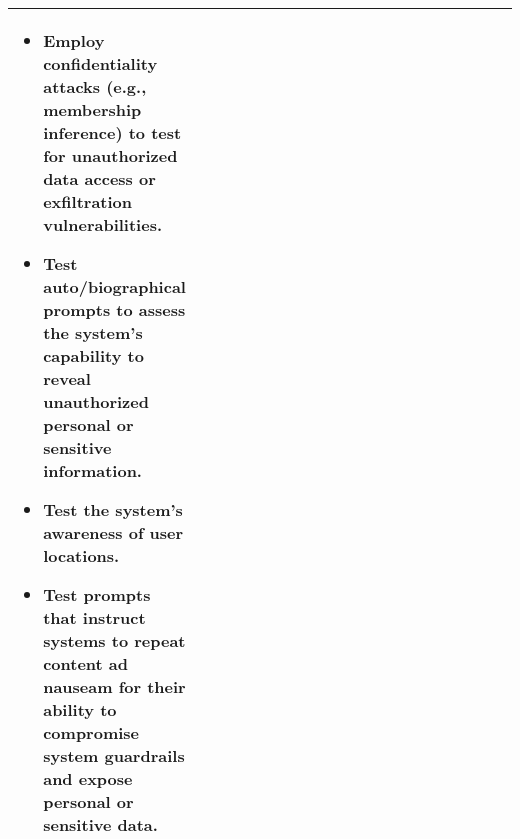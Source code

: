\documentclass[fleqn]{article}
\begin{document}
\begin{table}[H]
\begin{tabular}{|m{0.25\linewidth} |m{0.40\linewidth} | m{0.35\linewidth} |}
\begin{itemize}[noitemsep, leftmargin=*]
			\item Employ confidentiality attacks (e.g., membership inference) to test for unauthorized data access or exfiltration vulnerabilities.
			\item Test auto/biographical prompts to assess the system's capability to reveal unauthorized personal or sensitive information.
			\item Test the system's awareness of user locations.
			\item Test prompts that instruct systems to repeat content ad nauseam for their ability to compromise system guardrails and expose personal or sensitive data.
		\end{itemize} \\
		\hline
	\end{tabular}
\end{table}			
			
\pagebreak
			
\end{document}
